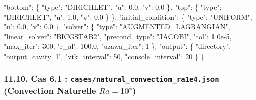 \documentclass[
  french,
]{article}
\newenvironment{Shaded}{}{}
\newcommand{\DataTypeTok}[1]{\textcolor[rgb]{0.56,0.13,0.00}{#1}}
\newcommand{\DecValTok}[1]{\textcolor[rgb]{0.25,0.63,0.44}{#1}}
\newcommand{\FloatTok}[1]{\textcolor[rgb]{0.25,0.63,0.44}{#1}}
\newcommand{\FunctionTok}[1]{\textcolor[rgb]{0.02,0.16,0.49}{#1}}
\newcommand{\StringTok}[1]{\textcolor[rgb]{0.25,0.44,0.63}{#1}}
\begin{document}
\begin{Shaded}
\begin{Highlighting}[]
    \DataTypeTok{"bottom"}\FunctionTok{:} \FunctionTok{\{} \DataTypeTok{"type"}\FunctionTok{:} \StringTok{"DIRICHLET"}\FunctionTok{,} \DataTypeTok{"u"}\FunctionTok{:} \FloatTok{0.0}\FunctionTok{,} \DataTypeTok{"v"}\FunctionTok{:} \FloatTok{0.0} \FunctionTok{\},}
    \DataTypeTok{"top"}\FunctionTok{:}    \FunctionTok{\{} \DataTypeTok{"type"}\FunctionTok{:} \StringTok{"DIRICHLET"}\FunctionTok{,} \DataTypeTok{"u"}\FunctionTok{:} \FloatTok{1.0}\FunctionTok{,} \DataTypeTok{"v"}\FunctionTok{:} \FloatTok{0.0} \FunctionTok{\}}
  \FunctionTok{\},}
  \DataTypeTok{"initial\_condition"}\FunctionTok{:} \FunctionTok{\{} \DataTypeTok{"type"}\FunctionTok{:} \StringTok{"UNIFORM"}\FunctionTok{,} \DataTypeTok{"u"}\FunctionTok{:} \FloatTok{0.0}\FunctionTok{,} \DataTypeTok{"v"}\FunctionTok{:} \FloatTok{0.0} \FunctionTok{\},}
  \DataTypeTok{"solver"}\FunctionTok{:} \FunctionTok{\{}
    \DataTypeTok{"type"}\FunctionTok{:} \StringTok{"AUGMENTED\_LAGRANGIAN"}\FunctionTok{,}
    \DataTypeTok{"linear\_solver"}\FunctionTok{:} \StringTok{"BICGSTAB2"}\FunctionTok{,}
    \DataTypeTok{"precond\_type"}\FunctionTok{:} \StringTok{"JACOBI"}\FunctionTok{,}
    \DataTypeTok{"tol"}\FunctionTok{:} \FloatTok{1.0e{-}5}\FunctionTok{,} \DataTypeTok{"max\_iter"}\FunctionTok{:} \DecValTok{300}\FunctionTok{,} \DataTypeTok{"r\_al"}\FunctionTok{:} \FloatTok{100.0}\FunctionTok{,} \DataTypeTok{"uzawa\_iter"}\FunctionTok{:} \DecValTok{1}
  \FunctionTok{\},}
  \DataTypeTok{"output"}\FunctionTok{:} \FunctionTok{\{} \DataTypeTok{"directory"}\FunctionTok{:} \StringTok{"output\_cavity\_l"}\FunctionTok{,} \DataTypeTok{"vtk\_interval"}\FunctionTok{:} \DecValTok{50}\FunctionTok{,} \DataTypeTok{"console\_interval"}\FunctionTok{:} \DecValTok{20} \FunctionTok{\}}
\FunctionTok{\}}
\end{Highlighting}
\end{Shaded}

\subsubsection{\texorpdfstring{11.10. Cas 6.1 :
\texttt{cases/natural\_convection\_ra1e4.json} (Convection Naturelle
\(Ra=10^4\))}{11.10. Cas 6.1 : cases/natural\_convection\_ra1e4.json (Convection Naturelle Ra=10\^{}4)}}\label{cas-6.1-casesnatural_convection_ra1e4.json-convection-naturelle-ra104}
\end{document}
